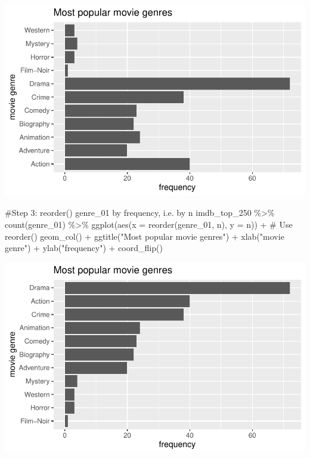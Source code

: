 \documentclass[
  letterpaper,
]{krantz}
\makeatletter
\newenvironment{Shaded}{\begin{snugshade}}{\end{snugshade}}
\newcommand{\AttributeTok}[1]{\textcolor[rgb]{0.40,0.45,0.13}{#1}}
\newcommand{\CommentTok}[1]{\textcolor[rgb]{0.37,0.37,0.37}{#1}}
\newcommand{\FunctionTok}[1]{\textcolor[rgb]{0.28,0.35,0.67}{#1}}
\newcommand{\NormalTok}[1]{\textcolor[rgb]{0.00,0.23,0.31}{#1}}
\newcommand{\SpecialCharTok}[1]{\textcolor[rgb]{0.37,0.37,0.37}{#1}}
\newcommand{\StringTok}[1]{\textcolor[rgb]{0.13,0.47,0.30}{#1}}
\newenvironment{kframe}{%
\medskip{}
\setlength{\fboxsep}{.8em}
 \def\at@end@of@kframe{}%
 \ifinner\ifhmode%
  \def\at@end@of@kframe{\end{minipage}}%
  \begin{minipage}{\columnwidth}%
 \fi\fi%
 \def\FrameCommand##1{\hskip\@totalleftmargin \hskip-\fboxsep
 \colorbox{shadecolor}{##1}\hskip-\fboxsep
     \hskip-\linewidth \hskip-\@totalleftmargin \hskip\columnwidth}%
 \MakeFramed {\advance\hsize-\width
   \@totalleftmargin\z@ \linewidth\hsize
   \@setminipage}}%
 {\par\unskip\endMakeFramed%
 \at@end@of@kframe}
\renewenvironment{Shaded}{\begin{kframe}}{\end{kframe}}
\makeatother
\begin{document}
\includegraphics{08_descriptive_statistics_files/figure-pdf/popular-genre-barplot-step-two-1.pdf}

\begin{Shaded}
\begin{Highlighting}[]
\CommentTok{\#Step 3: reorder() genre\_01 by frequency, i.e. by \textquotesingle{}n\textquotesingle{}}
\NormalTok{imdb\_top\_250 }\SpecialCharTok{\%\textgreater{}\%}
  \FunctionTok{count}\NormalTok{(genre\_01) }\SpecialCharTok{\%\textgreater{}\%}
  \FunctionTok{ggplot}\NormalTok{(}\FunctionTok{aes}\NormalTok{(}\AttributeTok{x =} \FunctionTok{reorder}\NormalTok{(genre\_01, n), }\AttributeTok{y =}\NormalTok{ n)) }\SpecialCharTok{+}  \CommentTok{\# Use \textquotesingle{}reorder()\textquotesingle{}}
  \FunctionTok{geom\_col}\NormalTok{() }\SpecialCharTok{+}
  \FunctionTok{ggtitle}\NormalTok{(}\StringTok{"Most popular movie genres"}\NormalTok{) }\SpecialCharTok{+}
  \FunctionTok{xlab}\NormalTok{(}\StringTok{"movie genre"}\NormalTok{) }\SpecialCharTok{+}
  \FunctionTok{ylab}\NormalTok{(}\StringTok{"frequency"}\NormalTok{) }\SpecialCharTok{+}
  \FunctionTok{coord\_flip}\NormalTok{()}
\end{Highlighting}
\end{Shaded}

\includegraphics{08_descriptive_statistics_files/figure-pdf/popular-genre-barplot-step-three-1.pdf}
\end{document}
